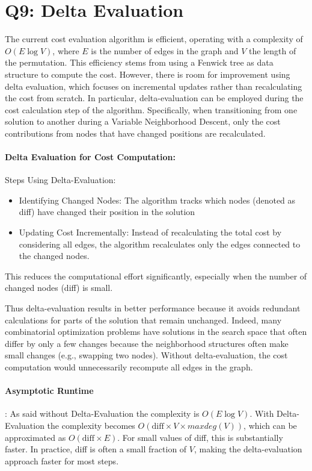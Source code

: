 \documentclass{article}
\begin{document}
\section*{Q9: Delta Evaluation}
The current cost evaluation algorithm is efficient, operating with a complexity of $O(E \log V)$, where $E$ is the number of edges in the graph and $V$ the length of the permutation. This efficiency stems from using a Fenwick tree as data structure to compute the cost. However, there is room for improvement using delta evaluation, which focuses on incremental updates rather than recalculating the cost from scratch. In particular, delta-evaluation can be employed during the cost calculation step of the algorithm. Specifically, when transitioning from one solution to another during a Variable Neighborhood Descent, only the cost contributions from nodes that have changed positions are recalculated.

\paragraph{Delta Evaluation for Cost Computation:} Steps Using Delta-Evaluation:
\begin{itemize}
    \item Identifying Changed Nodes: The algorithm tracks which nodes (denoted as diff) have changed their position in the solution
    \item Updating Cost Incrementally: Instead of recalculating the total cost by considering all edges, the algorithm recalculates only the edges connected to the changed nodes.
\end{itemize}
This reduces the computational effort significantly, especially when the number of changed nodes (diff) is small.

Thus delta-evaluation results in better performance because it avoids redundant calculations for parts of the solution that remain unchanged. Indeed, many combinatorial optimization problems have solutions in the search space that often differ by only a few changes because the neighborhood structures often make small changes (e.g., swapping two nodes). Without delta-evaluation, the cost computation would unnecessarily recompute all edges in the graph.

\paragraph{Asymptotic Runtime}:
As said without Delta-Evaluation the complexity is $O(E \log V)$. With Delta-Evaluation the complexity becomes $O(\text{diff}  \times V\times maxdeg(V))$, which can be approximated as $O(\text{diff} \times E)$. For small values of diff, this is substantially faster. In practice, diff is often a small fraction of $V$, making the delta-evaluation approach faster for most steps.
\end{document}
